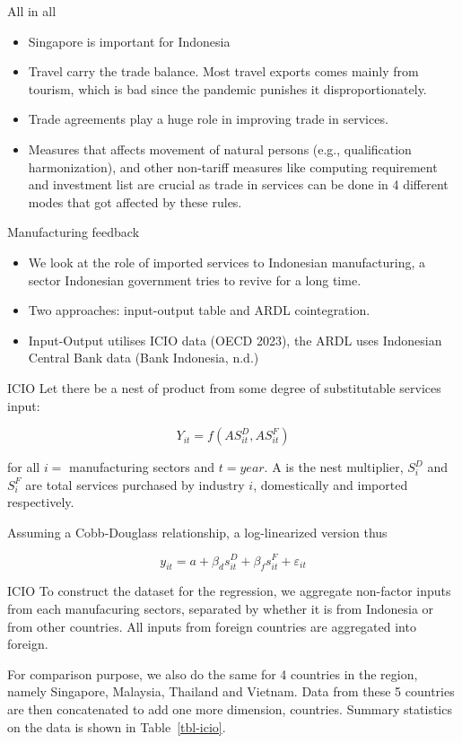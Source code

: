 \documentclass[
  ignorenonframetext,
]{beamer}
\begin{document}
\begin{frame}{All in all}
\label{all-in-all}
\begin{itemize}
\item
  Singapore is important for Indonesia
\item
  Travel carry the trade balance. Most travel exports comes mainly from
  tourism, which is bad since the pandemic punishes it
  disproportionately.
\item
  Trade agreements play a huge role in improving trade in services.
\item
  Measures that affects movement of natural persons (e.g., qualification
  harmonization), and other non-tariff measures like computing
  requirement and investment list are crucial as trade in services can
  be done in 4 different modes that got affected by these rules.
\end{itemize}
\end{frame}

\begin{frame}{Manufacturing feedback}
\label{manufacturing-feedback}
\begin{itemize}
\item
  We look at the role of imported services to Indonesian manufacturing,
  a sector Indonesian government tries to revive for a long time.
\item
  Two approaches: input-output table and ARDL cointegration.
\item
  Input-Output utilises ICIO data (OECD 2023), the ARDL uses Indonesian
  Central Bank data (Bank Indonesia, n.d.)
\end{itemize}
\end{frame}

\begin{frame}{ICIO}
\label{icio}
Let there be a nest of product from some degree of substitutable
services input:

\[
Y_{it}=f(AS^D_{it},AS^F_{it})
\]

for all \(i=\) manufacturing sectors and \(t=year\). A is the nest
multiplier, \(S^D_i\) and \(S^F_i\) are total services purchased by
industry \(i\), domestically and imported respectively.

Assuming a Cobb-Douglass relationship, a log-linearized version thus

\[
y_{it}=a+\beta_d s^D_{it}+\beta_f s^F_{it}+\varepsilon_{it}
\]
\end{frame}

\begin{frame}{ICIO}
\label{icio-1}
To construct the dataset for the regression, we aggregate non-factor
inputs from each manufacuring sectors, separated by whether it is from
Indonesia or from other countries. All inputs from foreign countries are
aggregated into foreign.

For comparison purpose, we also do the same for 4 countries in the
region, namely Singapore, Malaysia, Thailand and Vietnam. Data from
these 5 countries are then concatenated to add one more dimension,
countries. Summary statistics on the data is shown in
Table~\ref{tbl-icio}.
\end{frame}
\end{document}
